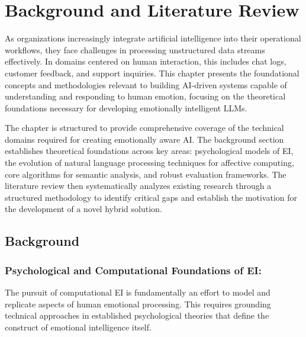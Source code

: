 \chapter{Background and Literature Review}
\label{chap:background}

As organizations increasingly integrate artificial intelligence into their operational workflows, they face challenges in processing unstructured data streams effectively. In domains centered on human interaction, this includes chat logs, customer feedback, and support inquiries. This chapter presents the foundational concepts and methodologies relevant to building AI-driven systems capable of understanding and responding to human emotion, focusing on the theoretical foundations necessary for developing emotionally intelligent LLMs.

\noindent The chapter is structured to provide comprehensive coverage of the technical domains required for creating emotionally aware AI. The background section establishes theoretical foundations across key areas: psychological models of EI, the evolution of natural language processing techniques for affective computing, core algorithms for semantic analysis, and robust evaluation frameworks. The literature review then systematically analyzes existing research through a structured methodology to identify critical gaps and establish the motivation for the development of a novel hybrid solution.

\section{Background}

\subsection{Psychological and Computational Foundations of EI:} 
The pursuit of computational EI is fundamentally an effort to model and replicate aspects of human emotional processing. This requires grounding technical approaches in established psychological theories that define the construct of emotional intelligence itself.

